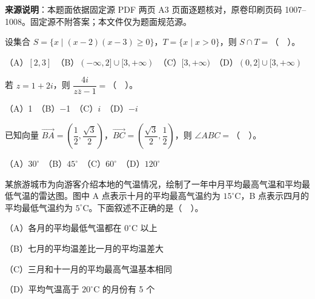 


\begin{gktip}
\textbf{来源说明}：本题面依据固定源 PDF 两页 A3 页面逐题核对，原卷印刷页码 1007–1008。固定源不附答案；本文件仅为题面规范源。
\end{gktip}


\begin{question}
设集合 \(S=\{x\mid (x-2)(x-3)\geq 0\}\)，\(T=\{x\mid x>0\}\)，则 \(S\cap T=\)（　）。

（A）\([2,3]\)　（B）\((-\infty,2]\cup[3,+\infty)\)　（C）\([3,+\infty)\)　（D）\((0,2]\cup[3,+\infty)\)

\end{question}
\begin{question}
若 \(z=1+2i\)，则 \(\dfrac{4i}{z\overline z-1}=\)（　）。

（A）1　（B）$-$1　（C）\(i\)　（D）\(-i\)

\end{question}
\begin{question}
已知向量 \(\overrightarrow{BA}=\left(\dfrac12,\dfrac{\sqrt3}{2}\right)\)，\(\overrightarrow{BC}=\left(\dfrac{\sqrt3}{2},\dfrac12\right)\)，则 \(\angle ABC=\)（　）。

（A）\(30^\circ\)　（B）\(45^\circ\)　（C）\(60^\circ\)　（D）\(120^\circ\)

\Needspace{0.4\textheight}
\end{question}
\begin{question}
某旅游城市为向游客介绍本地的气温情况，绘制了一年中月平均最高气温和平均最低气温的雷达图。图中 A 点表示十月的平均最高气温约为 \(15^\circ\mathrm C\)，B 点表示四月的平均最低气温约为 \(5^\circ\mathrm C\)。下面叙述不正确的是（　）。

（A）各月的平均最低气温都在 \(0^\circ\mathrm C\) 以上

（B）七月的平均温差比一月的平均温差大

（C）三月和十一月的平均最高气温基本相同

（D）平均气温高于 \(20^\circ\mathrm C\) 的月份有 5 个
\nopagebreak[4]
\begin{center}\end{center}
\nopagebreak[4]
\end{question}
